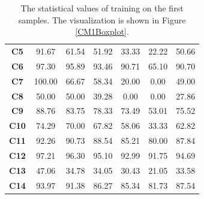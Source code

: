 \begin{appendices}
\begin{table}[ht!]
{\begin{tabular}{c|cccccc}
\rowcolor[HTML]{DAE8E5} 
{\color[HTML]{000000} \textbf{C5}} & {\color[HTML]{000000} 91.67} & {\color[HTML]{000000} 61.54} & {\color[HTML]{000000} 51.92} & {\color[HTML]{000000} 33.33} & {\color[HTML]{000000} 22.22} & {\color[HTML]{000000} 50.66} \\
\rowcolor[HTML]{EEF9FB} 
{\color[HTML]{000000} \textbf{C6}} & {\color[HTML]{000000} 97.30} & {\color[HTML]{000000} 95.89} & {\color[HTML]{000000} 93.46} & {\color[HTML]{000000} 90.71} & {\color[HTML]{000000} 65.10} & {\color[HTML]{000000} 90.70} \\
\rowcolor[HTML]{DAE8E5} 
{\color[HTML]{000000} \textbf{C7}} & {\color[HTML]{000000} 100.00} & {\color[HTML]{000000} 66.67} & {\color[HTML]{000000} 58.34} & {\color[HTML]{000000} 20.00} & {\color[HTML]{000000} 0.00} & {\color[HTML]{000000} 49.00} \\
\rowcolor[HTML]{EEF9FB} 
{\color[HTML]{000000} \textbf{C8}} & {\color[HTML]{000000} 50.00} & {\color[HTML]{000000} 50.00} & {\color[HTML]{000000} 39.28} & {\color[HTML]{000000} 0.00} & {\color[HTML]{000000} 0.00} & {\color[HTML]{000000} 27.86} \\
\rowcolor[HTML]{DAE8E5} 
{\color[HTML]{000000} \textbf{C9}} & {\color[HTML]{000000} 88.76} & {\color[HTML]{000000} 83.75} & {\color[HTML]{000000} 78.33} & {\color[HTML]{000000} 73.49} & {\color[HTML]{000000} 53.01} & {\color[HTML]{000000} 75.52} \\
\rowcolor[HTML]{EEF9FB} 
{\color[HTML]{000000} \textbf{C10}} & {\color[HTML]{000000} 74.29} & {\color[HTML]{000000} 70.00} & {\color[HTML]{000000} 67.82} & {\color[HTML]{000000} 58.06} & {\color[HTML]{000000} 33.33} & {\color[HTML]{000000} 62.82} \\
\rowcolor[HTML]{DAE8E5} 
{\color[HTML]{000000} \textbf{C11}} & {\color[HTML]{000000} 92.26} & {\color[HTML]{000000} 90.73} & {\color[HTML]{000000} 88.54} & {\color[HTML]{000000} 85.21} & {\color[HTML]{000000} 80.00} & {\color[HTML]{000000} 87.84} \\
\rowcolor[HTML]{EEF9FB} 
{\color[HTML]{000000} \textbf{C12}} & {\color[HTML]{000000} 97.21} & {\color[HTML]{000000} 96.30} & {\color[HTML]{000000} 95.10} & {\color[HTML]{000000} 92.99} & {\color[HTML]{000000} 91.75} & {\color[HTML]{000000} 94.69} \\
\rowcolor[HTML]{DAE8E5} 
{\color[HTML]{000000} \textbf{C13}} & {\color[HTML]{000000} 47.06} & {\color[HTML]{000000} 34.78} & {\color[HTML]{000000} 34.05} & {\color[HTML]{000000} 30.43} & {\color[HTML]{000000} 21.05} & {\color[HTML]{000000} 33.58} \\
\rowcolor[HTML]{EEF9FB} 
{\color[HTML]{000000} \textbf{C14}} & {\color[HTML]{000000} 93.97} & {\color[HTML]{000000} 91.38} & {\color[HTML]{000000} 86.27} & {\color[HTML]{000000} 85.34} & {\color[HTML]{000000} 81.73} & {\color[HTML]{000000} 87.54} \\
\bottomrule
\end{tabular}
}
\caption{The statistical values of training on the first samples. The visualization is shown in Figure \ref{CM1Boxplot}.}
\label{CM1BoxplotValues}
\end{table}


\end{appendices}
